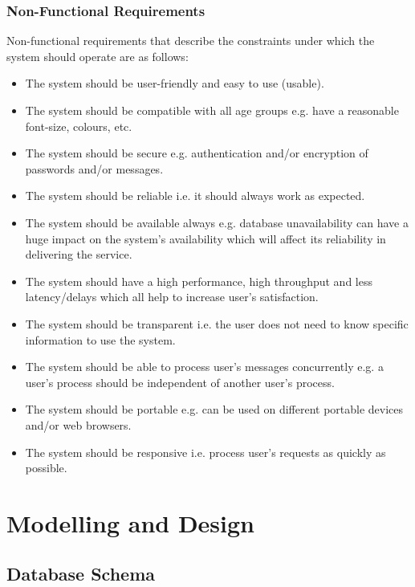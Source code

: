 \documentclass{article}
\begin{document}
\subsubsection{Non-Functional Requirements}
Non-functional requirements that describe the constraints under which the system should operate are as follows: 
\begin{itemize}
\item The system should be user-friendly and easy to use (usable). 
\item The system should be compatible with all age groups e.g. have a reasonable font-size, colours, etc. 
\item The system should be secure e.g. authentication and/or encryption of passwords and/or messages. 
\item The system should be reliable i.e. it should always work as expected. 
\item The system should be available always e.g. database unavailability can have a huge impact on the system’s availability which will affect its reliability in delivering the service. 
\item The system should have a high performance, high throughput and less latency/delays which all help to increase user’s satisfaction.
\item The system should be transparent i.e. the user does not need to know specific information to use the system. 
\item The system should be able to process user’s messages concurrently e.g. a user’s process should be independent of another user’s process. 
\item The system should be portable e.g. can be used on different portable devices and/or web browsers. 
\item The system should be responsive i.e. process user’s requests as quickly as possible. 
\end{itemize}

\newpage
\section{Modelling and Design}
\subsection{Database Schema}
\end{document}
